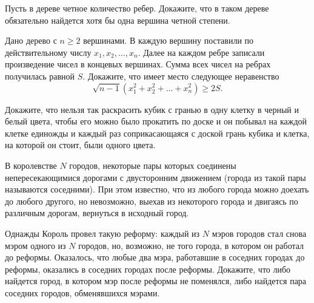 \begin{exersize}
	Пусть в дереве четное количество ребер. Докажите, что в таком дереве обязательно найдется хотя бы одна вершина четной степени.
\end{exersize}	


\begin{exersize}
	Дано дерево с $n \geqslant 2$ вершинами. В каждую вершину поставили по действительному числу $x_1, x_2, \dots, x_n$. Далее на каждом ребре записали произведение чисел в концевых вершинах. Сумма всех чисел на ребрах получилась равной $S$. Докажите, что имеет место следующее неравенство $$\sqrt{n-1} (x_1^2 + x_2^2 + \dots + x_n^2) \geqslant 2S.$$
\end{exersize}	

\begin{exersize}
	Докажите, что нельзя так раскрасить кубик с гранью в одну клетку в черный и белый цвета, чтобы его можно было прокатить по доске и он побывал на каждой клетке единожды и каждый раз соприкасающаяся с доской грань кубика и клетка, на которой он стоит, были одного цвета.
\end{exersize}	

\begin{exersize}
	В королевстве $N$ городов, некоторые пары которых соединены непересекающимися дорогами с двусторонним движением (города из такой пары называются соседними). При этом известно, что из любого города можно доехать до любого другого, но невозможно, выехав из некоторого города и двигаясь по различным дорогам, вернуться в исходный город.
	
	Однажды Король провел такую реформу: каждый из $N$ мэров городов стал снова мэром одного из $N$ городов, но, возможно, не того города, в котором он работал до реформы. Оказалось, что любые два мэра, работавшие в соседних городах до реформы, оказались в соседних городах после реформы. Докажите, что либо найдется город, в котором мэр после реформы не поменялся, либо найдется пара соседних городов, обменявшихся мэрами.
\end{exersize}	 
